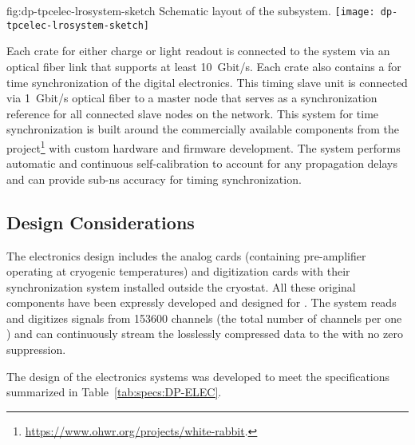 \begin{dunefigure}{fig:dp-tpcelec-lrosystem-sketch}
{Schematic layout of the   subsystem.}
\texttt{[image: dp-tpcelec-lrosystem-sketch]}
\end{dunefigure}

Each  crate for either charge or light readout is connected to the  system via an optical fiber link that supports at least \SI{10}{Gbit/s}. Each crate also contains a  for time synchronization of the digital electronics. This timing slave unit is connected via \SI{1}{Gbit/s} optical fiber to a master node that serves as a synchronization reference for all connected slave nodes on the network. This system for time synchronization is built around the commercially available components from the  project\footnote{\url{https://www.ohwr.org/projects/white-rabbit}.} with custom hardware and firmware development. The system performs automatic and continuous self-calibration to account for any propagation delays and can provide sub-\si{\nano\s} accuracy for timing synchronization.



\subsection{Design Considerations}
\label{ssec:dp-tpcelec-requir}


The  electronics design includes the analog  cards (containing pre-amplifier  operating at cryogenic temperatures) and digitization cards with their synchronization system installed outside the cryostat. All these original components have been expressly developed and designed for . The system reads and digitizes signals from \num{153600} channels (the total number of  channels per one ) and can continuously stream the losslessly compressed data to the  with no zero suppression. 

The design of the electronics systems was developed to meet the specifications summarized in Table~\ref{tab:specs:DP-ELEC}.



